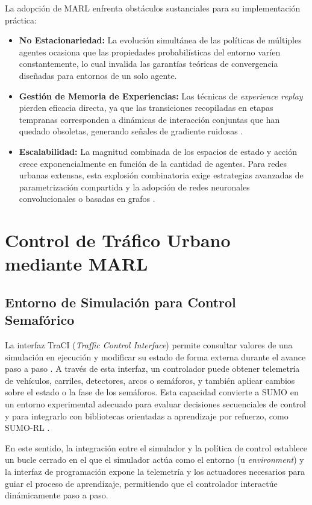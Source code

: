 La adopción de MARL enfrenta obstáculos sustanciales para su implementación práctica:
\begin{itemize}
    \item \textbf{No Estacionariedad:} La evolución simultánea de las políticas de múltiples agentes ocasiona que las propiedades probabilísticas del entorno varíen constantemente, lo cual invalida las garantías teóricas de convergencia diseñadas para entornos de un solo agente.
    \item \textbf{Gestión de Memoria de Experiencias:} Las técnicas de \textit{experience replay} pierden eficacia directa, ya que las transiciones recopiladas en etapas tempranas corresponden a dinámicas de interacción conjuntas que han quedado obsoletas, generando señales de gradiente ruidosas \cite{foerster2017}.
    \item \textbf{Escalabilidad:} La magnitud combinada de los espacios de estado y acción crece exponencialmente en función de la cantidad de agentes. Para redes urbanas extensas, esta explosión combinatoria exige estrategias avanzadas de parametrización compartida y la adopción de redes neuronales convolucionales o basadas en grafos \cite{gnn_traffic}.
\end{itemize}
\newpage


\section{Control de Tráfico Urbano mediante MARL}

\subsection{Entorno de Simulación para Control Semafórico}

La interfaz TraCI (\textit{Traffic Control Interface}) permite consultar valores de una simulación en ejecución y modificar su estado de forma externa durante el avance paso a paso \cite{sumo-doc}. A través de esta interfaz, un controlador puede obtener telemetría de vehículos, carriles, detectores, arcos o semáforos, y también aplicar cambios sobre el estado o la fase de los semáforos. Esta capacidad convierte a SUMO en un entorno experimental adecuado para evaluar decisiones secuenciales de control y para integrarlo con bibliotecas orientadas a aprendizaje por refuerzo, como SUMO-RL \cite{SUMO2018_SUMO,AlegreLSUMORLDoc}.

En este sentido, la integración entre el simulador y la política de control establece un bucle cerrado en el que el simulador actúa como el entorno (u \textit{environment}) y la interfaz de programación expone la telemetría y los actuadores necesarios para guiar el proceso de aprendizaje, permitiendo que el controlador interactúe dinámicamente paso a paso.


